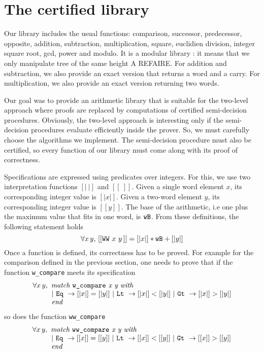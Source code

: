 \section{The certified library \label{Op}}
Our library includes the usual functions:
comparison, successor, predecessor, opposite, addition, subtraction,
multiplication, square, euclidien division, integer square root, gcd, 
power and modulo.
It is a modular library : it means that we only manipulate tree of the same
height {\HUGE A REFAIRE}. 
For addition and subtraction, we also provide an exact version
that returns a word and a carry.
For multiplication, we also provide an exact version
returning two words. 

Our goal was to provide an arithmetic library that is suitable for the two-level
approach where proofs are replaced by computations of certified semi-decision procedures.
Obviously, the two-level approach is interesting only if the semi-decision procedures evaluate
efficiently inside the prover.
So, we must carefully choose the algorithms we implement.
The semi-decision procedure must also be certified, so  every function of our library must come 
along with its proof of correctness. 

Specifications are expressed 
using predicates over integers. For this, we use two interpretation functions
{$ [|\ |]$} and {$[[\ ]]$}.
Given a single word element $x$, its corresponding integer value
is $[|x|]$. Given a two-word element $y$, its corresponding
integer value is $[[y]]$. The base of the arithmetic, i.e
one plus the maximum value that fits in one word, is ${\texttt{wB}}$. From these definitions, the following statement holds
$$\forall x\, y,\, [[\texttt{WW}\,\,x\,\,y\,]] = [|x|] * {\texttt{wB}} + [|y|]$$
Once a function is defined, its correctness has to be proved.
For example for the comparison defined in the previous section,
one needs to prove that if the function {\tt w\_compare} meets its specification
$$\begin{array}{l}
\forall x\, y, \,\, \textit{match {\tt w\_compare} x y with} \\
\qquad\,\,\,\,
 |\,\, \texttt{Eq}\,\, \rightarrow [|x|] = [|y|]\,\, | \,\,\texttt{Lt}\,\, \rightarrow [|x|] < [|y|] \,\,
| \,\,\texttt{Gt}\,\, \rightarrow [|x|] > [|y|]\\
\qquad\,\,\,\, \textit{end}
\end{array}
$$
so does the function {\tt ww\_compare}
$$\begin{array}{l}
\forall x\, y, \,\, \textit{match {\tt ww\_compare} x y with} \\
\qquad\,\,\,\,
 |\,\, \texttt{Eq}\,\, \rightarrow [[x]] = [[y]]\,\, | \,\,\texttt{Lt}\,\, \rightarrow [[x]] < [[y]] \,\,
| \,\,\texttt{Gt}\,\, \rightarrow [[x]] > [[y]]\\
\qquad\,\,\,\, \textit{end}
\end{array}
$$

